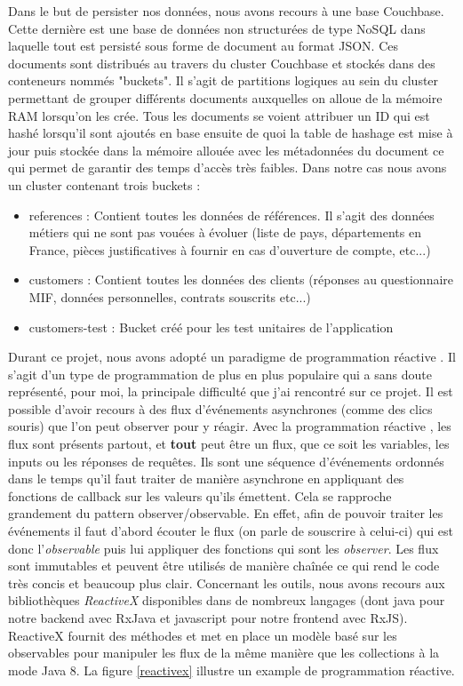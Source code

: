 	Dans le but de persister nos données, nous avons recours à une base Couchbase. Cette dernière est une base de données non structurées de type NoSQL dans laquelle tout est persisté sous forme de document au format JSON. Ces documents sont distribués au travers du cluster Couchbase et stockés dans des conteneurs nommés "buckets". Il s'agit de partitions logiques au sein du cluster permettant de grouper différents documents auxquelles on alloue de la mémoire RAM lorsqu'on les crée. Tous les documents se voient attribuer un ID qui est hashé lorsqu'il sont ajoutés en base ensuite de quoi la table de hashage est mise à jour puis stockée dans la mémoire allouée avec les métadonnées du document ce qui permet de garantir des temps d'accès très faibles. Dans notre cas nous avons un cluster contenant trois buckets :
	\begin{itemize}
		\item references : Contient toutes les données de références. Il s'agit des données métiers qui ne sont pas vouées à évoluer (liste de pays, départements en France, pièces justificatives à fournir en cas d'ouverture de compte, etc...)
		\item customers : Contient toutes les données des clients (réponses au questionnaire MIF, données personnelles, contrats souscrits etc...)
		\item customers-test : Bucket créé pour les test unitaires de l'application \\
	\end{itemize}
	
	Durant ce projet, nous avons adopté un paradigme de programmation réactive \cite{bib_progReac}. Il s'agit d'un type de programmation de plus en plus populaire qui a sans doute représenté, pour moi, la principale difficulté que j'ai rencontré sur ce projet. Il est possible d'avoir recours à des flux d'événements asynchrones (comme des clics souris) que l'on peut observer pour y réagir. Avec la programmation réactive \cite{bib_progReac2}, les flux sont présents partout, et \textbf{tout} peut être un flux, que ce soit les variables, les inputs ou les réponses de requêtes. Ils sont une séquence d'événements ordonnés dans le temps qu'il faut traiter de manière asynchrone en appliquant des fonctions de callback sur les valeurs qu'ils émettent. Cela se rapproche grandement du pattern observer/observable. En effet, afin de pouvoir traiter les événements il faut d'abord écouter le flux (on parle de souscrire à celui-ci) qui est donc l'\textit{observable} puis lui appliquer des fonctions qui sont les \textit{observer}. Les flux sont immutables et peuvent être utilisés de manière chaînée ce qui rend le code très concis et beaucoup plus clair. Concernant les outils, nous avons recours aux bibliothèques \textit{ReactiveX} disponibles dans de nombreux langages (dont java pour notre backend avec RxJava et javascript pour notre frontend avec RxJS). ReactiveX fournit des méthodes et met en place un modèle basé sur les observables pour manipuler les flux de la même manière que les collections à la mode Java 8. La figure \ref{reactivex} illustre un example de programmation réactive.
	
